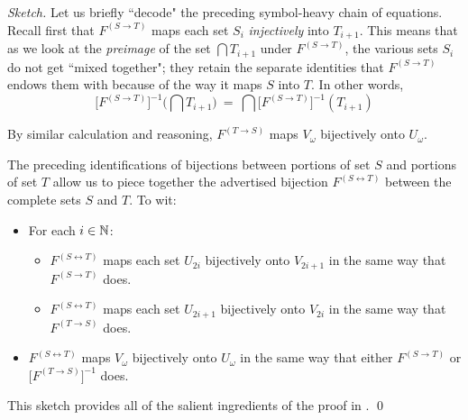 \begin{proof}[Sketch]
\smallskip

Let us briefly ``decode" the preceding symbol-heavy chain of equations.  Recall first that $F^{(S \rightarrow T)}$ maps each set $S_i$ {\em injectively} into $T_{i+1}$.  This means that as we look at the {\it preimage} of the set $\bigcap T_{i+1}$ under $F^{(S \rightarrow T)}$, the various sets $S_i$ do not get ``mixed together"; they retain the separate identities that $F^{(S \rightarrow T)}$ endows them with because of the way it maps $S$ into $T$.  In other words,
\[ \Big[F^{(S \rightarrow T)}\Big]^{-1} \Big(\bigcap T_{i+1} \Big) \ = \
\bigcap \Big[F^{(S \rightarrow T)}\Big]^{-1} (T_{i+1}) \]


\smallskip

\noindent
By similar calculation and reasoning, $F^{(T \rightarrow S)}$ maps $V_\omega$ bijectively onto $U_\omega$.

\medskip

The preceding identifications of bijections between portions of set $S$ and portions of set $T$ allow us to piece together the advertised bijection $F^{(S \leftrightarrow T)}$ between the complete sets $S$ and $T$.  To wit:
\begin{itemize}
\item
For each $i \in \mathbb{N}$:
  \begin{itemize}
  \item
$F^{(S \leftrightarrow T)}$ maps each set $U_{2i}$ bijectively onto $V_{2i+1}$ in the same way that $F^{(S \rightarrow T)}$ does.
  \medskip\item
$F^{(S \leftrightarrow T)}$ maps each set $U_{2i+1}$ bijectively onto $V_{2i}$ in the same way that $F^{(T \rightarrow S)}$ does.
\end{itemize}

\medskip\item
$F^{(S \leftrightarrow T)}$ maps $V_\omega$ bijectively onto $U_\omega$ in the same way that either $F^{(S \rightarrow T)}$ or $\Big[F^{(T \rightarrow S)}\Big]^{-1}$ does.
\end{itemize}
This sketch provides all of the salient ingredients of the proof in \cite{Tonien07}.  \qed
\end{proof}

\bigskip

